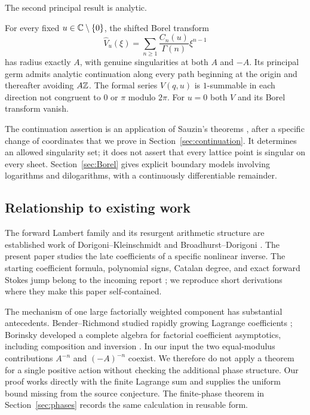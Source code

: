 The second principal result is analytic.

\begin{theorem}\label{thm:analytic-preview}
For every fixed $u\in\mathbb C\setminus\{0\}$, the shifted Borel transform
\begin{equation}\label{eq:BorelV}
 \widehat V_u(\xi)=\sum_{n\ge1}\frac{C_n(u)}{\Gamma(n)}\xi^{n-1}
\end{equation}
has radius exactly $A$, with genuine singularities at both $A$ and $-A$.
Its principal germ admits analytic continuation along every path beginning
at the origin and thereafter avoiding $A\mathbb Z$. The formal series $V(q,u)$
is $1$-summable in each direction not congruent to $0$ or $\pi$ modulo
$2\pi$. For $u=0$ both $V$ and its Borel transform vanish.
\end{theorem}

The continuation assertion is an application of Sauzin's theorems
\cite{Sauzin2015}, after a specific change of coordinates that we prove in
Section~\ref{sec:continuation}. It determines an allowed singularity set;
it does not assert that every lattice point is singular on every sheet.
Section~\ref{sec:Borel} gives explicit boundary models involving logarithms
and dilogarithms, with a continuously differentiable remainder.

\subsection{Relationship to existing work}

The forward Lambert family and its resurgent arithmetic structure are
established work of Dorigoni--Kleinschmidt and Broadhurst--Dorigoni
\cite{DK2021,BD2026}. The present paper studies the late coefficients of a
specific nonlinear inverse. The starting coefficient formula, polynomial
signs, Catalan degree, and exact forward Stokes jump belong to the incoming
report \cite{incoming}; we reproduce short derivations where they make
this paper self-contained.

The mechanism of one large factorially weighted component has substantial
antecedents. Bender--Richmond studied rapidly growing Lagrange coefficients
\cite{BR1984}; Borinsky developed a complete algebra for factorial
coefficient asymptotics, including composition and inversion
\cite{Borinsky2018}. In our input the two equal-modulus contributions
$A^{-n}$ and $(-A)^{-n}$ coexist. We therefore do not apply a theorem for a
single positive action without checking the additional phase structure.
Our proof works directly with the finite Lagrange sum and supplies the
uniform bound missing from the source conjecture. The finite-phase theorem
in Section~\ref{sec:phases} records the same calculation in reusable form.

